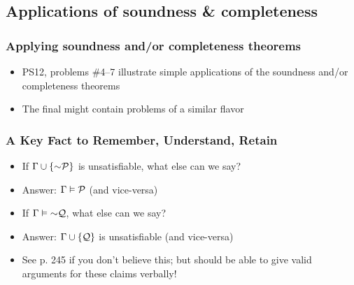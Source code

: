 \subsection{Applications of soundness \& completeness}

\begin{frame}
\frametitle{Applying soundness and/or completeness theorems}

\begin{itemize}[<+->]

\item PS12, problems \#4--7 illustrate simple applications of the soundness and/or completeness theorems

\item The final might contain problems of a similar flavor

\end{itemize}
\end{frame}

\begin{frame}
\frametitle{A Key Fact to Remember, Understand, Retain}

\begin{itemize}[<+->]

\item  If $\Gamma \cup \{ \enot \metav{P} \}$ is unsatisfiable, what else can we say? 

\item Answer: $\Gamma \vDash \mathcal{P}$ (and vice-versa)

\item If $\Gamma \entails \enot \metav{Q}$, what else can we say? 

\item Answer: $\Gamma \cup \{\mathcal{Q} \}$ is unsatisfiable (and vice-versa)

\item See p. 245 if you don't believe this; but should be able to give valid arguments for these claims verbally! 



\end{itemize}
\end{frame}

